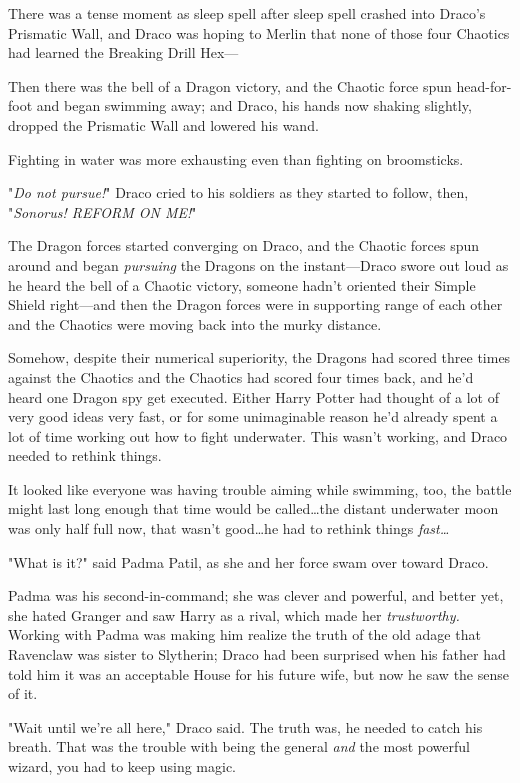 There was a tense moment as sleep spell after sleep spell crashed into Draco's
Prismatic Wall, and Draco was hoping to Merlin that none of those four Chaotics
had learned the Breaking Drill Hex---

Then there was the bell of a Dragon victory, and the Chaotic force spun
head-for-foot and began swimming away; and Draco, his hands now shaking
slightly, dropped the Prismatic Wall and lowered his wand.

Fighting in water was more exhausting even than fighting on broomsticks.

"\emph{Do not pursue!}" Draco cried to his soldiers as they started to follow,
then, "\emph{Sonorus! REFORM ON ME!}"

The Dragon forces started converging on Draco, and the Chaotic forces spun
around and began \emph{pursuing} the Dragons on the instant---Draco swore out
loud as he heard the bell of a Chaotic victory, someone hadn't oriented their
Simple Shield right---and then the Dragon forces were in supporting
range of each other and the Chaotics were moving back into the murky distance.

Somehow, despite their numerical superiority, the Dragons had scored three
times against the Chaotics and the Chaotics had scored four times back, and
he'd heard one Dragon spy get executed. Either Harry Potter had thought of a
lot of very good ideas very fast, or for some unimaginable reason he'd already
spent a lot of time working out how to fight underwater. This wasn't working,
and Draco needed to rethink things.

It looked like everyone was having trouble aiming while swimming, too, the
battle might last long enough that time would be called…the distant
underwater moon was only half full now, that wasn't good…he had to
rethink things \emph{fast…}

"What is it?" said Padma Patil, as she and her force swam over toward Draco.

Padma was his second-in-command; she was clever and powerful, and better yet,
she hated Granger and saw Harry as a rival, which made her \emph{trustworthy.}
Working with Padma was making him realize the truth of the old adage that
Ravenclaw was sister to Slytherin; Draco had been surprised when his father had
told him it was an acceptable House for his future wife, but now he saw the
sense of it.

"Wait until we're all here," Draco said. The truth was, he needed to catch his
breath. That was the trouble with being the general \emph{and} the most
powerful wizard, you had to keep using magic.

